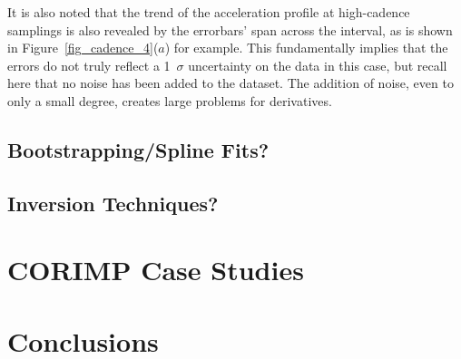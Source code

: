 \documentclass[preprint2]{aastex}
\begin{document}
It is also noted that the trend of the acceleration profile at high-cadence samplings is also revealed by the errorbars' span across the interval, as is shown in Figure~\ref{fig_cadence_4}($a$) for example. This fundamentally implies that the errors do not truly reflect a 1~$\sigma$ uncertainty on the data in this case, but recall here that no noise has been added to the dataset. The addition of noise, even to only a small degree, creates large problems for derivatives.

\subsection{Bootstrapping/Spline Fits?}

\subsection{Inversion Techniques?}

\section{CORIMP Case Studies}

\section{Conclusions}
\label{sect_conclusions}




\acknowledgments

\end{document}
